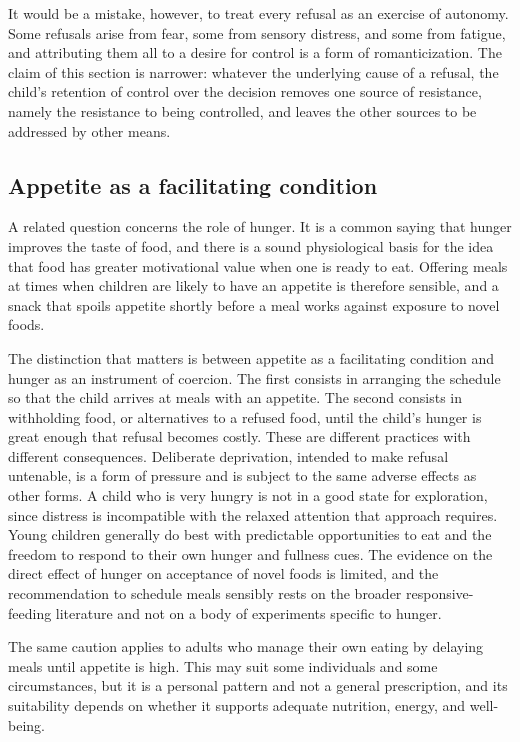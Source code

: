 \documentclass[11pt]{article}
\theoremstyle{remark}
\begin{document}
It would be a mistake, however, to treat every refusal as an exercise of autonomy. Some refusals arise from fear, some from sensory distress, and some from fatigue, and attributing them all to a desire for control is a form of romanticization. The claim of this section is narrower: whatever the underlying cause of a refusal, the child's retention of control over the decision removes one source of resistance, namely the resistance to being controlled, and leaves the other sources to be addressed by other means.

\subsection{Appetite as a facilitating condition}

A related question concerns the role of hunger. It is a common saying that hunger improves the taste of food, and there is a sound physiological basis for the idea that food has greater motivational value when one is ready to eat. Offering meals at times when children are likely to have an appetite is therefore sensible, and a snack that spoils appetite shortly before a meal works against exposure to novel foods.

The distinction that matters is between appetite as a facilitating condition and hunger as an instrument of coercion. The first consists in arranging the schedule so that the child arrives at meals with an appetite. The second consists in withholding food, or alternatives to a refused food, until the child's hunger is great enough that refusal becomes costly. These are different practices with different consequences. Deliberate deprivation, intended to make refusal untenable, is a form of pressure and is subject to the same adverse effects as other forms. A child who is very hungry is not in a good state for exploration, since distress is incompatible with the relaxed attention that approach requires. Young children generally do best with predictable opportunities to eat and the freedom to respond to their own hunger and fullness cues. The evidence on the direct effect of hunger on acceptance of novel foods is limited, and the recommendation to schedule meals sensibly rests on the broader responsive-feeding literature and not on a body of experiments specific to hunger.

The same caution applies to adults who manage their own eating by delaying meals until appetite is high. This may suit some individuals and some circumstances, but it is a personal pattern and not a general prescription, and its suitability depends on whether it supports adequate nutrition, energy, and well-being.
\end{document}
